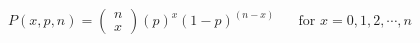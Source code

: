 

\[
P(x,p,n) = \left( \begin{array}{c} n \\ x \end{array} \right) (p)^{x}(1 - p)^{(n-x)} \;\;\;\;\;\; \mbox{for $x = 0, 1, 2, \cdots , n$}
\]




